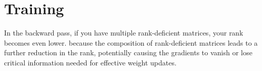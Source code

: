 \section{Training}

In the backward pass, if you have multiple rank-deficient matrices, your rank becomes even lower.
because the composition of rank-deficient matrices leads to a further reduction in the rank, potentially causing the gradients to vanish or lose critical information needed for effective weight updates.
